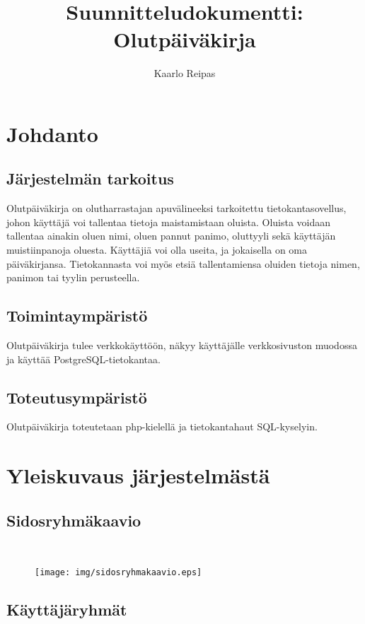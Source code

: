 \documentclass[12pt]{article}
\title{Suunnitteludokumentti: Olutpäiväkirja}
\author{Kaarlo Reipas}
\begin{document}
\maketitle

\sloppy

\section{Johdanto}
\label{sec:johdanto}

\subsection{Järjestelmän tarkoitus}

Olutpäiväkirja on olutharrastajan apuvälineeksi tarkoitettu tietokantasovellus, johon käyttäjä voi tallentaa tietoja maistamistaan oluista. Oluista voidaan tallentaa ainakin oluen nimi, oluen pannut panimo, oluttyyli sekä käyttäjän muistiinpanoja oluesta. Käyttäjiä voi olla useita, ja jokaisella on oma päiväkirjansa. Tietokannasta voi myös etsiä tallentamiensa oluiden tietoja nimen, panimon tai tyylin perusteella.

\subsection{Toimintaympäristö}

Olutpäiväkirja tulee verkkokäyttöön, näkyy käyttäjälle verkkosivuston muodossa ja käyttää PostgreSQL-tietokantaa.

\subsection{Toteutusympäristö}

Olutpäiväkirja toteutetaan php-kielellä ja tietokantahaut SQL-kyselyin.

\section{Yleiskuvaus järjestelmästä}

\subsection{Sidosryhmäkaavio}
\ 
\begin{figure}[H]
  \centering
  \texttt{[image: img/sidosryhmakaavio.eps]}
\end{figure}

\subsection{Käyttäjäryhmät}
\end{document}
